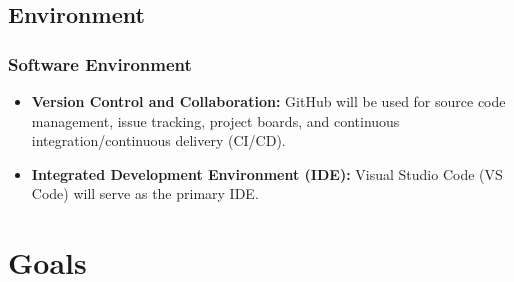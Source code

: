 \documentclass{article}
\begin{document}
\subsection{Environment}

\subsubsection*{Software Environment}

\begin{itemize}
    \item \textbf{Version Control and Collaboration:} GitHub will be used for source code management, issue tracking, project boards, and continuous integration/continuous delivery (CI/CD).
    \item \textbf{Integrated Development Environment (IDE):} Visual Studio Code (VS Code) will serve as the primary IDE.
\end{itemize}

\section{Goals}
\end{document}
